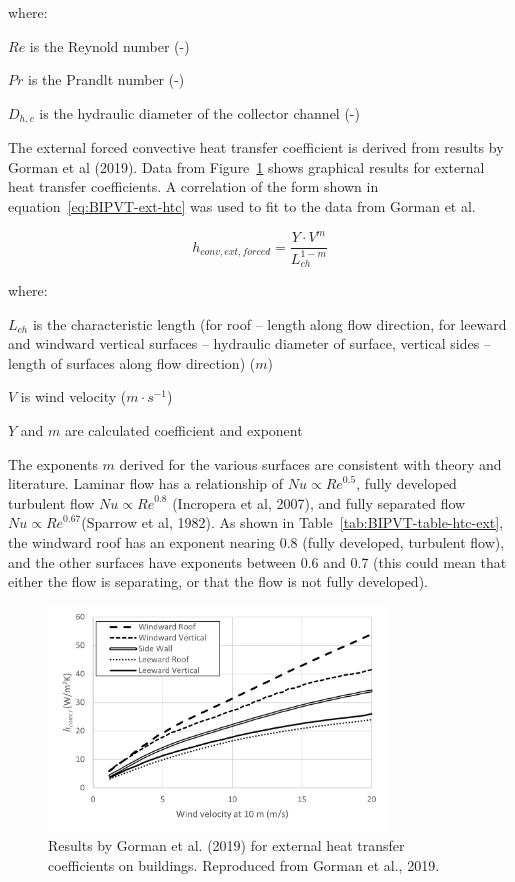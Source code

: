 {where:

\(Re\) is the Reynold number (-)

\(Pr\) is the Prandlt number (-)

\(D_{h,c}\) is the hydraulic diameter of the collector channel (-)

The external forced convective heat transfer coefficient is derived from results by Gorman et al (2019). Data from Figure~\ref{fig:BIPVT-external-htc}  shows graphical results for external heat transfer coefficients. A correlation of the form shown in equation~\ref{eq:BIPVT-ext-htc} was used to fit to the data from Gorman et al.

\begin{equation}
h_{conv,ext,forced}=\frac{Y\cdot V^{m}}{L^{1-m}_{ch}}
\label{eq:BIPVT-ext-htc}
\end{equation}

where:

\(L_{ch}\) is the characteristic length (for roof – length along flow direction, for leeward and windward vertical surfaces – hydraulic diameter of surface, vertical sides – length of surfaces along flow direction) (\(m\))

\(V\) is wind velocity (\(m\cdot s^{-1}\))

\(Y\) and \(m\) are calculated coefficient and exponent

The exponents \(m\) derived for the various surfaces are consistent with theory and literature. Laminar flow has a relationship of \(Nu\propto{Re}^{0.5}\), fully developed turbulent flow \(Nu\propto{Re}^{0.8}\) (Incropera et al, 2007), and fully separated flow \(Nu\propto{Re}^{0.67}\)(Sparrow et al, 1982). As shown in Table~\ref{tab:BIPVT-table-htc-ext}, the windward roof has an exponent nearing 0.8 (fully developed, turbulent flow), and the other surfaces have exponents between 0.6 and 0.7 (this could mean that either the flow is separating, or that the flow is not fully developed).

\begin{figure}[hbtp] %
\centering
\includegraphics[width=0.8\textwidth, height=0.8\textheight, keepaspectratio=true]{media/BIPVT_2.png}
\caption{Results by Gorman et al. (2019) for external heat transfer coefficients on buildings. Reproduced from Gorman et al., 2019. \protect \label{fig:BIPVT-external-htc}}
\end{figure}

}
